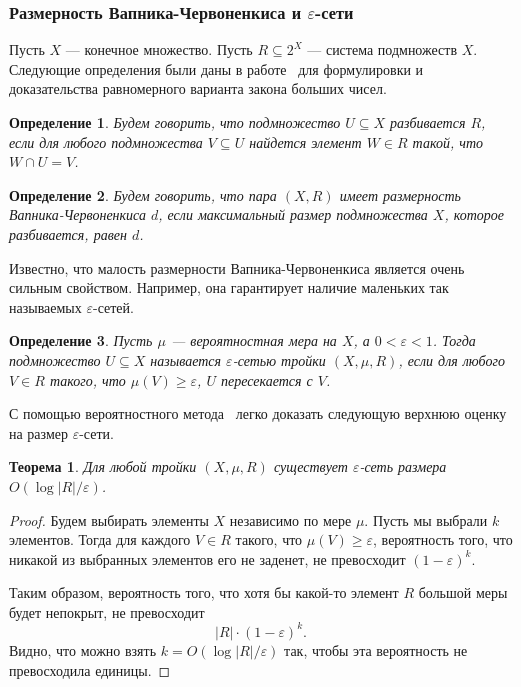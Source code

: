 \documentclass[12pt]{article}
\newcommand{\eps}{\varepsilon}
\newtheorem{definition}{Определение}
\newtheorem{theorem}{Теорема}
\begin{document}
    \subsubsection{Размерность Вапника-Червоненкиса и $\eps$-сети}
    \label{subsubsection_vapnik_chervonenkis}

    Пусть $X$ --- конечное множество. Пусть $R \subseteq 2^X$ --- система подмножеств $X$.
    Следующие определения были даны в работе~\cite{VC71} для формулировки и доказательства равномерного варианта
    закона больших чисел.

    \begin{definition}
        Будем говорить, что подмножество $U \subseteq X$ \emph{разбивается} $R$, если
        для любого подмножества $V \subseteq U$ найдется элемент $W \in R$ такой,
        что $W \cap U = V$.
    \end{definition}
    \begin{definition}
        Будем говорить, что пара $(X, R)$ имеет размерность Вапника-Червоненкиса $d$, если максимальный размер 
        подмножества $X$, которое разбивается, равен $d$.
    \end{definition}

    Известно, что малость размерности Вапника-Червоненкиса является очень сильным свойством. Например, она гарантирует
    наличие маленьких так называемых $\varepsilon$-сетей.

    \begin{definition}
        Пусть $\mu$ --- вероятностная мера на $X$, а $0 < \varepsilon < 1$.
        Тогда подмножество $U \subseteq X$
        называется \emph{$\varepsilon$-сетью} тройки $(X, \mu, R)$, если для любого
        $V \in R$ такого, что $\mu(V) \geq \varepsilon$, $U$ пересекается с $V$.
    \end{definition}

    С помощью вероятностного метода~\cite{AS92} легко доказать следующую верхнюю оценку на размер
    $\varepsilon$-сети.

    \begin{theorem}
        \label{naive_epsilon_net}
        Для любой тройки $(X, \mu, R)$ существует $\varepsilon$-сеть размера
        $O(\log |R| / \varepsilon)$.
    \end{theorem}
    \begin{proof}
        Будем выбирать элементы $X$ независимо по мере $\mu$.
        Пусть мы выбрали $k$ элементов. Тогда для каждого $V \in R$ такого, что
        $\mu(V) \geq \varepsilon$, вероятность того, что никакой из выбранных элементов
        его не заденет, не превосходит $(1 - \varepsilon)^k$.

        Таким образом, вероятность того, что хотя бы какой-то элемент $R$ большой меры будет
        непокрыт, не превосходит
        $$
            |R| \cdot (1 - \varepsilon)^k.
        $$
        Видно, что можно взять $k = O(\log |R| / \varepsilon)$ так, чтобы эта вероятность не превосходила
        единицы.
    \end{proof}
\end{document}
